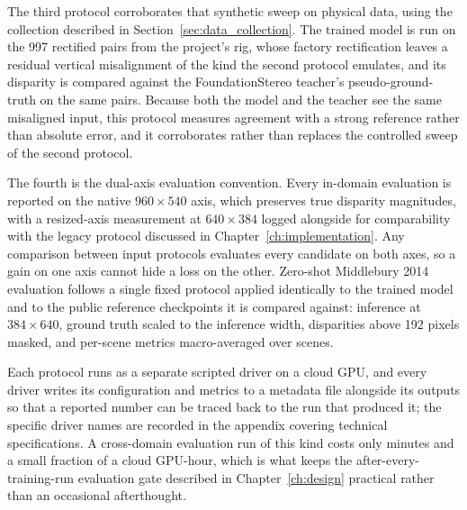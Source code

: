 The third protocol corroborates that synthetic sweep on physical data,
using the collection described in Section~\ref{sec:data_collection}.
The trained model is run on the 997 rectified pairs from the project's
rig, whose factory rectification leaves a residual vertical misalignment
of the kind the second protocol emulates, and its disparity is compared
against the FoundationStereo teacher's pseudo-ground-truth on the same
pairs. Because both the model and the teacher see the same misaligned
input, this protocol measures agreement with a strong reference rather
than absolute error, and it corroborates rather than replaces the
controlled sweep of the second protocol.

The fourth is the dual-axis evaluation convention. Every in-domain
evaluation is reported on the native $960\times 540$ axis, which
preserves true disparity magnitudes, with a resized-axis measurement at
$640\times 384$ logged alongside for comparability with the legacy
protocol discussed in Chapter~\ref{ch:implementation}. Any comparison
between input protocols evaluates every candidate on both axes, so a
gain on one axis cannot hide a loss on the other. Zero-shot Middlebury
2014 evaluation follows a single fixed protocol applied identically to
the trained model and to the public reference checkpoints it is compared
against: inference at $384\times 640$, ground truth scaled to the
inference width, disparities above 192 pixels masked, and per-scene
metrics macro-averaged over scenes.

Each protocol runs as a separate scripted driver on a cloud GPU, and
every driver writes its configuration and metrics to a metadata file
alongside its outputs so that a reported number can be traced back to
the run that produced it; the specific driver names are recorded in the
appendix covering technical specifications. A cross-domain evaluation
run of this kind
costs only minutes and a small fraction of a cloud GPU-hour, which is
what keeps the after-every-training-run evaluation gate described in
Chapter~\ref{ch:design} practical rather than an occasional afterthought.

\FloatBarrier
